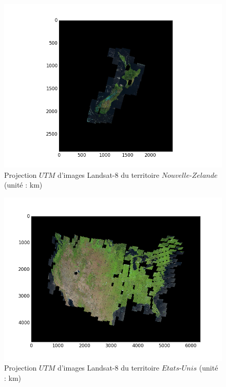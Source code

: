 \documentclass{book}
\begin{document}
\begin{figure}[H]
\begin{center}
\includegraphics[scale=0.8]{images/projection_newzealand.png}
\end{center}
\caption{Projection $UTM$ d'images Landsat-8 du territoire $Nouvelle$-$Zelande$ (unité : km)}
\label{projection_newzealand}
\end{figure}
\begin{figure}[H]
\begin{center}
\includegraphics[scale=0.8]{images/projection_usa.png}
\end{center}
\caption{Projection $UTM$ d'images Landsat-8 du territoire $Etats$-$Unis$ (unité : km)}
\label{projection_usa}
\end{figure}
\end{document}
